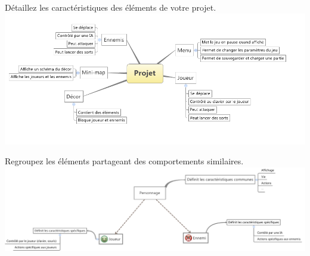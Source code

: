 \begin{frame}
  Détaillez les caractéristiques des éléments de votre projet.
    \includegraphics[scale=0.4]{images/project_overview2.png}
\end{frame}

\begin{frame}
  Regroupez les éléments partageant des comportements similaires.
    \includegraphics[scale=0.3]{images/project_overview3.png}
\end{frame}
